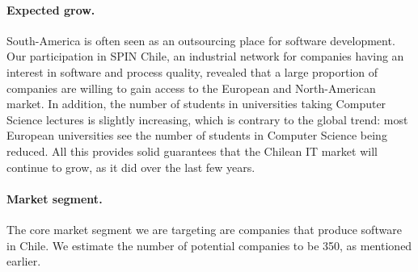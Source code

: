 \documentclass[runningheads]{llncs}
\begin{document}
\paragraph{Expected grow.} South-America is often seen as an outsourcing place for software development. Our participation in SPIN Chile, an industrial network for companies having an interest in software and process quality, revealed that a large proportion of companies are willing to gain access to the European and North-American market. In addition, the number of students in universities taking Computer Science lectures is slightly increasing, which is contrary to the global trend: most European universities see the number of students in Computer Science being reduced. All this provides solid guarantees that the Chilean IT market will continue to grow, as it did over the last few years.

\paragraph{Market segment.} The core market segment we are targeting are companies that produce software in Chile. We estimate the number of potential companies to be 350, as mentioned earlier. 



\end{document}

